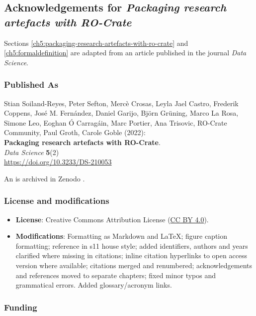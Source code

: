 \subsection{Acknowledgements for \emph{Packaging research artefacts with RO-Crate}}\label{ch11:packagingrocrate}

Sections \vref{ch5:packaging-research-artefacts-with-ro-crate} and \vref{ch5:formaldefinition} are adapted from an article published in the journal \emph{Data Science}.

\subsubsection*{Published As}

Stian Soiland-Reyes, Peter Sefton, Mercè Crosas, Leyla Jael Castro,
Frederik Coppens, José M. Fernández, Daniel Garijo, Björn Grüning, Marco
La Rosa, Simone Leo, Eoghan Ó Carragáin, Marc Portier, Ana Trisovic,
RO-Crate Community, Paul Groth, Carole Goble (2022):\\
\textbf{Packaging research artefacts with RO-Crate}.\\
\emph{Data Science} \textbf{5}(2)\\
\url{https://doi.org/10.3233/DS-210053}

An  is archived in Zenodo \cite{Soiland-Reyes 2022g}.

\subsubsection*{License and modifications}

\begin{itemize}
\tightlist
\item
  \textbf{License}: Creative Commons Attribution License
  (\href{https://spdx.org/licenses/CC-BY-4.0}{CC BY 4.0}).
\item
  \textbf{Modifications}: Formatting as Markdown and LaTeX; figure caption
  formatting; reference in s11 house style; added identifiers, authors
  and years clarified where missing in citations; inline citation
  hyperlinks to open access version where available; citations merged and renumbered; 
  acknowledgements and references moved to separate chapters; fixed minor typos and grammatical errors.  Added glossary/acronym links.
\end{itemize}


\subsubsection*{Funding}


